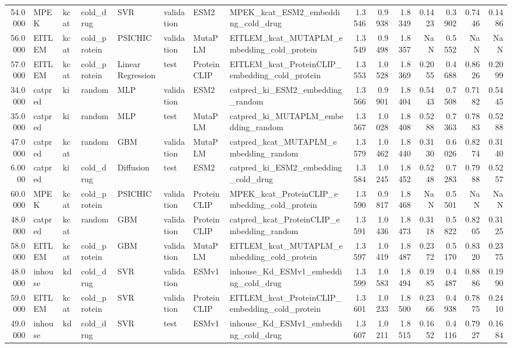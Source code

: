 \begin{tabular}{rlllllllrrrrrrr}
54.0000 & MPEK & kcat & cold_drug & SVR & validation & ESM2 & MPEK_kcat_ESM2_embedding_cold_drug & 1.3546 & 0.9938 & 1.8349 & 0.1423 & 0.3902 & 0.7446 & 0.1486 \\
56.0000 & EITLEM & kcat & cold_protein & PSICHIC & validation & MutaPLM & EITLEM_kcat_MUTAPLM_embedding_cold_protein & 1.3549 & 0.9498 & 1.8357 & NaN & 0.5552 & NaN & NaN \\
57.0000 & EITLEM & kcat & cold_protein & Linear Regression & test & ProteinCLIP & EITLEM_kcat_ProteinCLIP_embedding_cold_protein & 1.3553 & 1.0528 & 1.8369 & 0.2055 & 0.4688 & 0.8626 & 0.2099 \\
34.0000 & catpred & ki & random & MLP & validation & ESM2 & catpred_ki_ESM2_embedding_random & 1.3566 & 0.9901 & 1.8404 & 0.5443 & 0.7508 & 0.7182 & 0.5445 \\
35.0000 & catpred & ki & random & MLP & test & MutaPLM & catpred_ki_MUTAPLM_embedding_random & 1.3567 & 1.0028 & 1.8408 & 0.5288 & 0.7363 & 0.7883 & 0.5288 \\
47.0000 & catpred & kcat & random & GBM & validation & MutaPLM & catpred_kcat_MUTAPLM_embedding_random & 1.3579 & 1.0462 & 1.8440 & 0.3130 & 0.6026 & 0.8274 & 0.3140 \\
6.0000 & catpred & ki & cold_drug & Diffusion & test & ESM2 & catpred_ki_ESM2_embedding_cold_drug & 1.3584 & 1.0245 & 1.8452 & 0.5248 & 0.7283 & 0.7988 & 0.5257 \\
60.0000 & MPEK & kcat & cold_protein & PSICHIC & validation & ProteinCLIP & MPEK_kcat_ProteinCLIP_embedding_cold_protein & 1.3590 & 0.9817 & 1.8468 & NaN & 0.5501 & NaN & NaN \\
48.0000 & catpred & kcat & random & GBM & validation & ProteinCLIP & catpred_kcat_ProteinCLIP_embedding_random & 1.3591 & 1.0436 & 1.8473 & 0.3118 & 0.5822 & 0.8205 & 0.3125 \\
58.0000 & EITLEM & kcat & cold_protein & GBM & validation & MutaPLM & EITLEM_kcat_MUTAPLM_embedding_cold_protein & 1.3597 & 1.0419 & 1.8487 & 0.2372 & 0.5170 & 0.8320 & 0.2375 \\
48.0000 & inhouse & kd & cold_drug & SVR & validation & ESMv1 & inhouse_Kd_ESMv1_embedding_cold_drug & 1.3599 & 1.0583 & 1.8494 & 0.1985 & 0.4487 & 0.8886 & 0.1990 \\
59.0000 & EITLEM & kcat & cold_protein & SVR & validation & ProteinCLIP & EITLEM_kcat_ProteinCLIP_embedding_cold_protein & 1.3601 & 1.0233 & 1.8500 & 0.2366 & 0.4938 & 0.7875 & 0.2410 \\
49.0000 & inhouse & kd & cold_drug & SVR & test & ESMv1 & inhouse_Kd_ESMv1_embedding_cold_drug & 1.3607 & 1.0211 & 1.8515 & 0.1652 & 0.4116 & 0.7927 & 0.1684 \\

\end{tabular}
